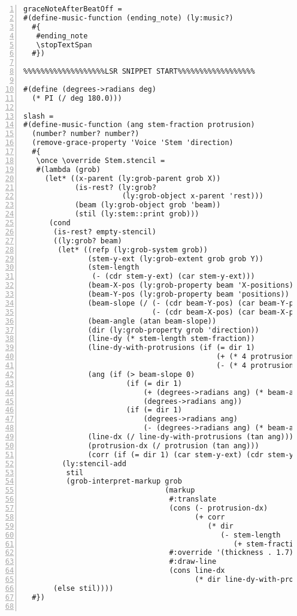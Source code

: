 \begin{Verbatim}[numbers=left,xleftmargin=5mm]
graceNoteAfterBeatOff =
#(define-music-function (ending_note) (ly:music?)
  #{
   #ending_note
   \stopTextSpan
  #})
  
%%%%%%%%%%%%%%%%%%%LSR SNIPPET START%%%%%%%%%%%%%%%%%%

#(define (degrees->radians deg)
  (* PI (/ deg 180.0)))

slash =
#(define-music-function (ang stem-fraction protrusion)
  (number? number? number?)
  (remove-grace-property 'Voice 'Stem 'direction)
  #{
   \once \override Stem.stencil =
   #(lambda (grob)
     (let* ((x-parent (ly:grob-parent grob X))
            (is-rest? (ly:grob?
                       (ly:grob-object x-parent 'rest)))
            (beam (ly:grob-object grob 'beam))
            (stil (ly:stem::print grob)))
      (cond
       (is-rest? empty-stencil)
       ((ly:grob? beam)
        (let* ((refp (ly:grob-system grob))
               (stem-y-ext (ly:grob-extent grob grob Y))
               (stem-length
                (- (cdr stem-y-ext) (car stem-y-ext)))
               (beam-X-pos (ly:grob-property beam 'X-positions))
               (beam-Y-pos (ly:grob-property beam 'positions))
               (beam-slope (/ (- (cdr beam-Y-pos) (car beam-Y-pos))
                              (- (cdr beam-X-pos) (car beam-X-pos))))
               (beam-angle (atan beam-slope))
               (dir (ly:grob-property grob 'direction))
               (line-dy (* stem-length stem-fraction))
               (line-dy-with-protrusions (if (= dir 1)
                                             (+ (* 4 protrusion) beam-angle)
                                             (- (* 4 protrusion) beam-angle)))
               (ang (if (> beam-slope 0)
                        (if (= dir 1)
                            (+ (degrees->radians ang) (* beam-angle 0.7))
                            (degrees->radians ang))
                        (if (= dir 1)
                            (degrees->radians ang)
                            (- (degrees->radians ang) (* beam-angle 0.7)))))
               (line-dx (/ line-dy-with-protrusions (tan ang)))
               (protrusion-dx (/ protrusion (tan ang)))
               (corr (if (= dir 1) (car stem-y-ext) (cdr stem-y-ext))))
         (ly:stencil-add
          stil
          (grob-interpret-markup grob
                                 (markup
                                  #:translate
                                  (cons (- protrusion-dx)
                                        (+ corr
                                           (* dir
                                              (- stem-length
                                                 (+ stem-fraction protrusion)))))
                                  #:override '(thickness . 1.7)
                                  #:draw-line
                                  (cons line-dx
                                        (* dir line-dy-with-protrusions)))))))
       (else stil))))
  #})


\end{Verbatim}
